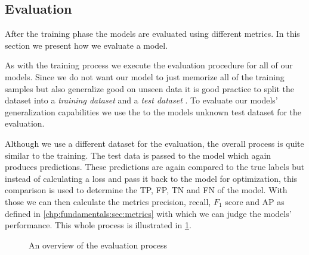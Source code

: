 \subsection{Evaluation}
\label{chp:study:sec:design:subsec:evaluation}
After the training phase the models are evaluated using different metrics.
In this section we present how we evaluate a model.

As with the training process we execute the evaluation procedure for all of our models.
Since we do not want our model to just memorize all of the training samples but also generalize good on unseen data it is good practice to split the dataset into a \textit{training dataset} and a \textit{test dataset} \parencite{Reitermanova:2010}.
To evaluate our models' generalization capabilities we use the to the models unknown test dataset for the evaluation.

Although we use a different dataset for the evaluation, the overall process is quite similar to the training.
The test data is passed to the model which again produces predictions.
These predictions are again compared to the true labels but instead of calculating a loss and pass it back to the model for optimization, this comparison is used to determine the \ac{TP}, \ac{FP}, \ac{TN} and \ac{FN} of the model.
With those we can then calculate the metrics precision, recall, $F_1$ score and \ac{AP} as defined in \cref{chp:fundamentals:sec:metrics} with which we can judge the models' performance.
This whole process is illustrated in \cref{fig:study:design:evaluation}.

\newpage
\begin{figure}[htpb]
    \centering
    \def\svgwidth{\columnwidth}
    
    \caption[Study Design: Evaluation]{An overview of the evaluation process}\label{fig:study:design:evaluation}
\end{figure}
